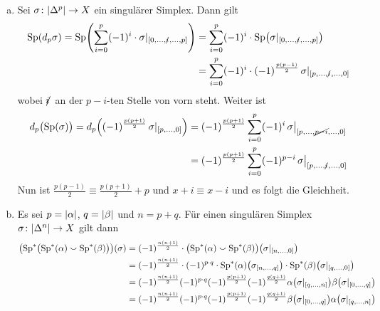 \begin{beweis}
	\begin{enumerate}[a)]
		\item Sei $\sigma \colon \abs{\Delta^p} \to X$ ein singulärer Simplex. Dann gilt
		\begin{align}
			\Sp(d_p \sigma) = \Sp\enbrace*{\sum_{i=0}^{p} (-1)^i \cdot \sigma|_{\benbrace*{0, \ldots , \slashedi, \ldots ,p}}} 
			&= \sum_{i=0}^{p} (-1)^i \cdot \Sp \enbrace*{\sigma|_{\benbrace*{0, \ldots , \slashedi, \ldots , p}}} \\
			&= \sum_{i=0}^{p} (-1)^i \cdot (-1)^{\frac{p(p-1)}{2}} \,\sigma|_{\benbrace*{p, \ldots , \slashedi, \ldots , 0}}
		\end{align}
		wobei $\slashedi$ an der $p-i$-ten Stelle von vorn steht. Weiter ist
		\begin{align}
			d_p \enbrace[\big]{\Sp(\sigma)} = d_p \enbrace*{(-1)^{\frac{p(p+1)}{2}} \,\sigma|_{\benbrace*{p, \ldots ,0}}} &= (-1)^{\frac{p(p+1)}{2}} \sum_{i=0}^{p} (-1)^i\, 
			\sigma\big|_{\benbrace*{p, \ldots , \cancel{p-i}, \ldots ,0}} \\ 
			&= (-1)^{\frac{p(p+1)}{2}} \sum_{i=0}^{p} (-1)^{p-i} \,\sigma\big|_{\benbrace*{p, \ldots ,\slashedi, \ldots ,0}}
		\end{align}
		Nun ist $\frac{p(p-1)}{2} \equiv \frac{p(p+1)}{2} + p$ und $x +i \equiv x-i$ und es folgt die Gleichheit.
		\item Es sei $p=\abs*{\alpha}$, $q=\abs*{\beta}$ und $n=p+q$.
		Für einen singulären Simplex $\sigma \colon \abs{\Delta^n} \to X$ gilt dann
		\begin{align}
			\enbrace*{\Sp^* \enbrace[\big]{\Sp^*(\alpha) \cupp \Sp^*(\beta)}}(\sigma) &= (-1)^{\frac{n(n+1)}{2}} \cdot \enbrace[\big]{\Sp^*(\alpha) \cupp \Sp^*(\beta)} 
			\enbrace*{\sigma|_{\benbrace*{n, \ldots ,0}}} \\
			&= (-1)^{\frac{n(n+1)}{2}} \cdot (-1)^{p \cdot q}\cdot \Sp^*(\alpha) \enbrace*{\sigma_{\benbrace*{n, \ldots , q}}} \cdot \Sp^*(\beta) 
			\enbrace*{\sigma|_{\benbrace*{q, \ldots ,0}}} \\
			&= (-1)^{\frac{n(n+1)}{2}} (-1)^{p \cdot q} (-1)^{\frac{p(p+1)}{2}} (-1)^{\frac{q(q+1)}{2}} \alpha \enbrace*{\sigma|_{\benbrace*{q, \ldots ,n}}}
			\beta \enbrace*{\sigma|_{\benbrace{0, \ldots ,q}}} \\
			&= (-1)^{\frac{n(n+1)}{2}} (-1)^{p \cdot q} (-1)^{\frac{p(p+1)}{2}} (-1)^{\frac{q(q+1)}{2}} \beta \enbrace*{\sigma|_{\benbrace{0, \ldots ,q}}} 
			\alpha \enbrace*{\sigma|_{\benbrace*{q, \ldots ,n}}} \\

\end{align}
\end{enumerate}
\end{beweis}
